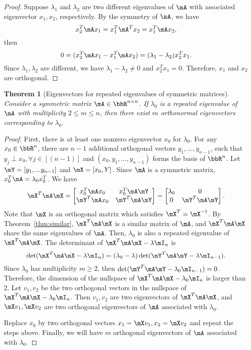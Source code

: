 \documentclass[11pt]{article}
\theoremstyle{plain}
\newtheorem{thm}{Theorem}[section]
\theoremstyle{definition}
\begin{document}
\begin{proof}
	Suppose $\lambda_1$ and $\lambda_2$ are two different eigenvalues of $\mA$ with associated eigenvector $x_1, x_2$, respectively. By the symmetry of $\mA$, we have
	\[ x_2^T \mA x_1 = x_1^T \mA^T x_2  = x_1^T \mA x_2,\]
	then 
	\[  0 = ( x_2^T \mA x_1 -  x_1^T \mA x_2 ) = (\lambda_1 - \lambda_2) x_2^T x_1. \]
	Since $\lambda_1, \lambda_2$ are different, we have $\lambda_1 - \lambda_2 \neq 0$ and $x_2^T x_1 = 0$. Therefore, $x_1$ and $x_2$ are orthogonal. 
\end{proof}

\begin{thm}[Eigenvectors for repeated eigenvalues of symmetric matrices]\label{thm:symmrepeat} Consider a symmetric matrix $\mA \in \bbR^{n \times n}$. If $\lambda_0$ is a repeated eigenvalue of $\mA$ with multiplicity $2 \leq m \leq n$, then there exist $m$ orthonormal eigenvectors corresponding to $\lambda_0$.
\end{thm}

\begin{proof}
	First, there is at least one nonzero eigenvector $x_0$ for $\lambda_0$. For any $x_0 \in \bbR^{n}$, there are $n-1$ additional orthogonal vectors $y_1,...,y_{n-1}$, such that $y_j \perp x_0, \forall j \in [(n-1)]$ and $(x_0, y_1,...,y_{n-1})$ forms the basis of $\bbR^n$. Let $\mY = [y_1,...y_{n-1}]$ and $\mX = [x_0,Y]$. Since $\mA$ is a symmetric matrix, $x_0^T \mA = \lambda_0 x_0^T $. We have
	\begin{align}\label{eq:symmrepeat}
		\mX^T \mA \mX =  \begin{bmatrix}
			x_0^T \mA x_0 & x_0^T \mA \mY\\
			\mY^T \mA x_0 & \mY^T \mA \mY 
		\end{bmatrix} =  \begin{bmatrix}
			\lambda_0 & 0\\
			0 & \mY^T \mA \mY 
		\end{bmatrix} .
	\end{align}
	Note that $\mX$ is an orthogonal matrix which satisfies $\mX^T = \mX^{-1}$. By Theorem~\ref{thm:similar}, $\mX^T \mA \mX$ is a similar matrix of $\mA$, and $\mX^T \mA \mX$ share the same eigenvalues of $\mA$. Then, $\lambda_0$ is also a repeated eigenvalue of $\mX^T \mA \mX$. The determinant of $\mX^T \mA \mX - \lambda \mI_n$ is 
	\[  \det(\mX^T \mA \mX - \lambda \mI_n) = (\lambda_0 - \lambda) \det(\mY^T \mA \mY - \lambda \mI_{n-1}). \]
	Since $\lambda_0$ has multiplicity $m \geq 2$, then $\det(\mY^T \mA \mY - \lambda_0 \mI_{n-1}) = 0$. Therefore, the dimension of the nullspace of $\mX^T \mA \mX - \lambda_0 \mI_n$ is larger than 2. Let $v_1,v_2$ be the two orthogonal vectors in the nullspace of $\mX^T \mA \mX - \lambda_0 \mI_n$. Then $v_1, v_2$ are two eigenvectors of $\mX^T \mA \mX$, and $\mX v_1, \mX v_2$ are two orthogonal eigenvectors of $\mA$ associated with $\lambda_0$. 
	
	Replace $x_0$ by two orthogonal vectors $x_1 = \mX v_1, x_2 = \mX v_2$ and repeat the steps above. Finally, we will have $m$ orthogonal eigenvectors of $\mA$ associated with $\lambda_0$.
\end{proof}
\end{document}
